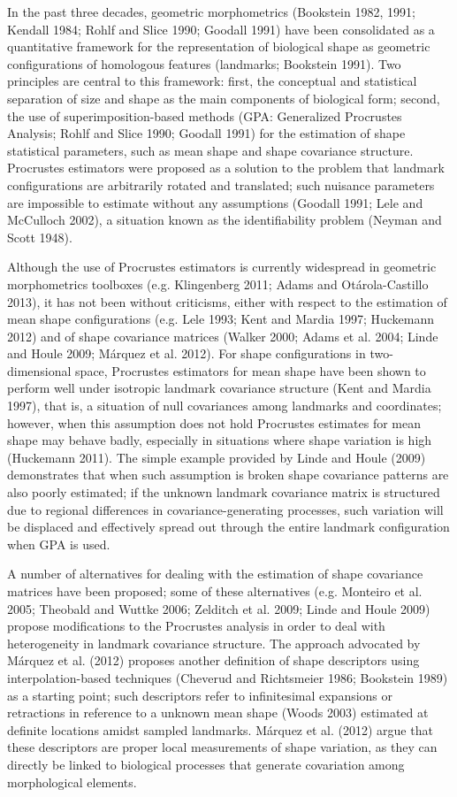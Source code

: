 \documentclass[12pt,]{article}
\begin{document}
In the past three decades, geometric morphometrics (Bookstein 1982,
1991; Kendall 1984; Rohlf and Slice 1990; Goodall 1991) have been
consolidated as a quantitative framework for the representation of
biological shape as geometric configurations of homologous features
(landmarks; Bookstein 1991). Two principles are central to this
framework: first, the conceptual and statistical separation of size and
shape as the main components of biological form; second, the use of
superimposition-based methods (GPA: Generalized Procrustes Analysis;
Rohlf and Slice 1990; Goodall 1991) for the estimation of shape
statistical parameters, such as mean shape and shape covariance
structure. Procrustes estimators were proposed as a solution to the
problem that landmark configurations are arbitrarily rotated and
translated; such nuisance parameters are impossible to estimate without
any assumptions (Goodall 1991; Lele and McCulloch 2002), a situation
known as the identifiability problem (Neyman and Scott 1948).

Although the use of Procrustes estimators is currently widespread in
geometric morphometrics toolboxes (e.g. Klingenberg 2011; Adams and
Otárola-Castillo 2013), it has not been without criticisms, either with
respect to the estimation of mean shape configurations (e.g. Lele 1993;
Kent and Mardia 1997; Huckemann 2012) and of shape covariance matrices
(Walker 2000; Adams et al. 2004; Linde and Houle 2009; Márquez et al.
2012). For shape configurations in two-dimensional space, Procrustes
estimators for mean shape have been shown to perform well under
isotropic landmark covariance structure (Kent and Mardia 1997), that is,
a situation of null covariances among landmarks and coordinates;
however, when this assumption does not hold Procrustes estimates for
mean shape may behave badly, especially in situations where shape
variation is high (Huckemann 2011). The simple example provided by Linde
and Houle (2009) demonstrates that when such assumption is broken shape
covariance patterns are also poorly estimated; if the unknown landmark
covariance matrix is structured due to regional differences in
covariance-generating processes, such variation will be displaced and
effectively spread out through the entire landmark configuration when
GPA is used.

A number of alternatives for dealing with the estimation of shape
covariance matrices have been proposed; some of these alternatives (e.g.
Monteiro et al. 2005; Theobald and Wuttke 2006; Zelditch et al. 2009;
Linde and Houle 2009) propose modifications to the Procrustes analysis
in order to deal with heterogeneity in landmark covariance structure.
The approach advocated by Márquez et al. (2012) proposes another
definition of shape descriptors using interpolation-based techniques
(Cheverud and Richtsmeier 1986; Bookstein 1989) as a starting point;
such descriptors refer to infinitesimal expansions or retractions in
reference to a unknown mean shape (Woods 2003) estimated at definite
locations amidst sampled landmarks. Márquez et al. (2012) argue that
these descriptors are proper local measurements of shape variation, as
they can directly be linked to biological processes that generate
covariation among morphological elements.
\end{document}
